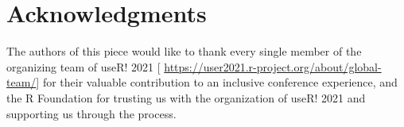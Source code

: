 \documentclass[10pt,letterpaper]{article}
\begin{document}
\section*{Acknowledgments}
The authors of this piece would like to thank every single member of the organizing team of useR! 2021 [ \url{https://user2021.r-project.org/about/global-team/}] for their valuable contribution to an inclusive conference experience, and the R Foundation for trusting us with the organization of useR! 2021 and supporting us through the process. 








\end{document}
